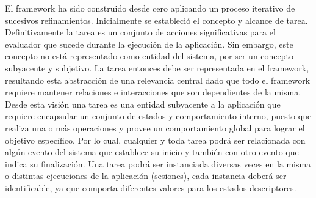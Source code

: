 El framework ha sido construido desde cero aplicando un proceso iterativo de sucesivos refinamientos. Inicialmente se estableció el concepto y alcance de tarea. Definitivamente la tarea es un conjunto de acciones significativas para el evaluador que sucede durante la ejecución de la aplicación. Sin embargo, este concepto no está representado como entidad del sistema, por ser un concepto subyacente y subjetivo. La tarea entonces debe ser representada en el framework, resultando esta abstracción de una relevancia central dado que todo el framework requiere mantener relaciones e interacciones que son dependientes de la misma. Desde esta visión una  tarea es una entidad subyacente a la aplicación que requiere encapsular un conjunto de estados y comportamiento interno,  puesto que realiza una o más operaciones y provee un comportamiento global para lograr el objetivo específico. Por lo cual, cualquier y toda tarea podrá ser relacionada con algún evento del sistema que establece su inicio y también con otro evento que indica su finalización. Una tarea podrá ser instanciada diversas veces en la misma o distintas ejecuciones de la aplicación (sesiones), cada instancia deberá ser identificable, ya que comporta diferentes valores para los estados descriptores. 

